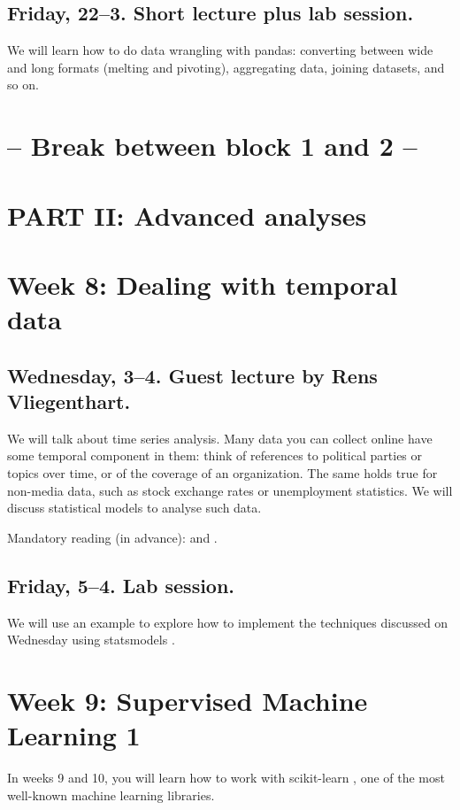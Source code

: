 \documentclass[a4paper,10pt]{report}
\begin{document}
\subsection*{Friday, 22--3.  Short lecture plus lab session.}
We will learn how to do data wrangling with pandas: converting between wide and long formats (melting and pivoting), aggregating data, joining datasets, and so on.


\section*{-- Break between block 1 and 2 -- }

\section*{PART II: Advanced analyses}


\section*{Week 8: Dealing with temporal data}

\subsection*{Wednesday, 3--4. Guest lecture by Rens Vliegenthart.}
We will talk about time series analysis. Many data you can collect online have some temporal component in them: think of references to political parties or topics over time, or of the coverage of an organization. The same holds true for non-media data, such as stock exchange rates or unemployment statistics. We will discuss statistical models to analyse such data.


Mandatory reading (in advance): \cite{Vliegenthart2014} and \cite{Strycharz2018}.


\subsection*{Friday, 5--4. Lab session.}
We will use an example to explore how to implement the techniques discussed on Wednesday using statsmodels \citep{statsmodels}.



\section*{Week 9: Supervised Machine Learning 1}
In weeks 9 and 10, you will learn how to work with scikit-learn \citep{scikit-learn}, one of the most well-known machine learning libraries.
\end{document}
